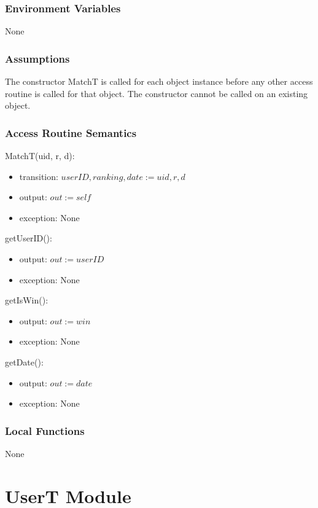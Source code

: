\documentclass[12pt, titlepage]{article}
\begin{document}
\subsubsection{Environment Variables}
None

\subsubsection{Assumptions}
The constructor MatchT is called for each object instance before any other access routine is called for that object. The constructor cannot be called on an existing object.

\subsubsection{Access Routine Semantics}

\noindent MatchT(uid, r, d):
\begin{itemize}
\item transition: $userID, ranking, date := uid, r, d$
\item output: $out := self$
\item exception: None
\end{itemize}

\noindent getUserID():
\begin{itemize}
\item output: $out := userID$
\item exception: None
\end{itemize}

\noindent getIsWin():
\begin{itemize}
\item output: $out := win$
\item exception: None
\end{itemize}

\noindent getDate():
\begin{itemize}
\item output: $out := date$
\item exception: None
\end{itemize}
\subsubsection{Local Functions}

None

\newpage

\section{UserT Module}  \label{UserT}
\end{document}
